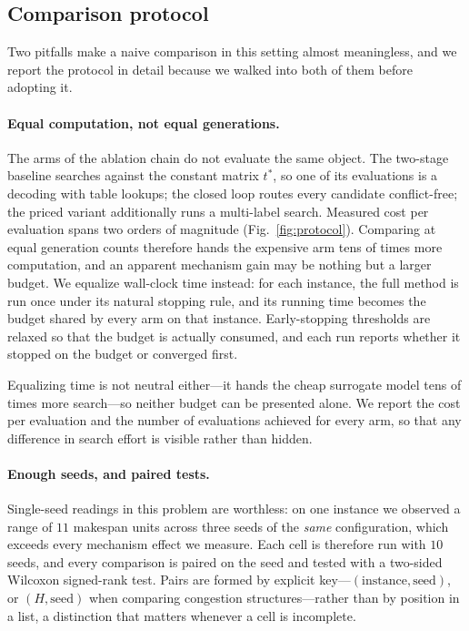 \documentclass[manuscript,screen,review]{acmart}
\begin{document}
\subsection{Comparison protocol}
\label{sec:protocol}

Two pitfalls make a naive comparison in this setting almost meaningless, and we
report the protocol in detail because we walked into both of them before
adopting it.

\paragraph{Equal computation, not equal generations.}
The arms of the ablation chain do not evaluate the same object. The two-stage
baseline searches against the constant matrix $t^{*}$, so one of its
evaluations is a decoding with table lookups; the closed loop routes every
candidate conflict-free; the priced variant additionally runs a multi-label
search. Measured cost per evaluation spans two orders of magnitude
(Fig.~\ref{fig:protocol}). Comparing at equal generation counts therefore hands
the expensive arm tens of times more computation, and an apparent mechanism
gain may be nothing but a larger budget. We equalize wall-clock time instead:
for each instance, the full method is run once under its natural stopping rule,
and its running time becomes the budget shared by every arm on that instance.
Early-stopping thresholds are relaxed so that the budget is actually consumed,
and each run reports whether it stopped on the budget or converged first.

Equalizing time is not neutral either---it hands the cheap surrogate model tens
of times more search---so neither budget can be presented alone. We report the
cost per evaluation and the number of evaluations achieved for every arm, so
that any difference in search effort is visible rather than hidden.

\paragraph{Enough seeds, and paired tests.}
Single-seed readings in this problem are worthless: on one instance we observed
a range of $11$ makespan units across three seeds of the \emph{same}
configuration, which exceeds every mechanism effect we measure. Each cell is
therefore run with $10$ seeds, and every comparison is paired on the seed and
tested with a two-sided Wilcoxon signed-rank test. Pairs are formed by explicit
key---$(\text{instance},\text{seed})$, or $(H,\text{seed})$ when comparing
congestion structures---rather than by position in a list, a distinction that
matters whenever a cell is incomplete.
\end{document}
